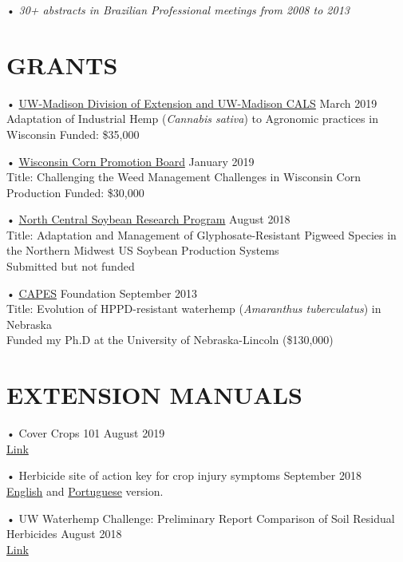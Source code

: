 \documentclass[11pt,]{article}
\begin{document}
• \emph{30+ abstracts in Brazilian Professional meetings from 2008 to
2013}

\hypertarget{grants}{%
\section{GRANTS}\label{grants}}

• \href{https://oeo.cals.wisc.edu}{UW-Madison Division of Extension and
UW-Madison CALS} \hfill March 2019\\
Adaptation of Industrial Hemp (\emph{Cannabis sativa}) to Agronomic
practices in Wisconsin Funded: \$35,000

• \href{http://wicorn.org}{Wisconsin Corn Promotion Board}
\hfill January 2019\\
Title: Challenging the Weed Management Challenges in Wisconsin Corn
Production Funded: \$30,000

• \href{http://www.ncsrp.com/}{North Central Soybean Research Program}
\hfill August 2018\\
Title: Adaptation and Management of Glyphosate-Resistant Pigweed Species
in the Northern Midwest US Soybean Production Systems\\
Submitted but not funded

• \href{http://www.capes.gov.br/}{CAPES} Foundation \hfill September
2013\\
Title: Evolution of HPPD-resistant waterhemp (\emph{Amaranthus
tuberculatus}) in Nebraska\\
Funded my Ph.D at the University of Nebraska-Lincoln (\$130,000)

\hypertarget{extension-manuals}{%
\section{EXTENSION MANUALS}\label{extension-manuals}}

• Cover Crops 101 \hfill August 2019\\
\href{https://learningstore.extension.wisc.edu/collections/farming/products/cover-crops-101}{Link}

• Herbicide site of action key for crop injury symptoms \hfill September
2018\\
\href{http://www.wiscweeds.info/img/2018\%20Herbicide\%20SOA\%20injury\%20chart/2018_HerbicideInjury_EN.pdf}{English}
and
\href{https://maxweeds.rbind.io/files/Herbicide\%20chart/2018_HerbicideInjury_BRA.pdf}{Portuguese}
version.

• UW Waterhemp Challenge: Preliminary Report Comparison of Soil Residual
Herbicides \hfill August 2018\\
\href{http://www.wiscweeds.info/img/2018\%20waterhemp\%20challenge/Waterhemp\%20Management\%20PRE\%20Comparison_Lancaster\%20WI\%202018.pdf}{Link}
\end{document}
